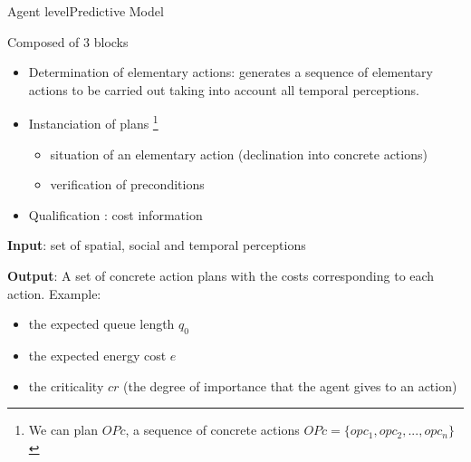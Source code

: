 \begin{frame}{Agent level}{Predictive Model}
\par Composed of 3 blocks
\begin{itemize}
    \item Determination of elementary actions: generates a sequence of elementary actions to be carried out taking into account all temporal perceptions.
    \item Instanciation of plans \footnote{We can plan $OPc$, a sequence of concrete actions $OPc = \{opc_{1}, opc_{2}, ... , opc_{n} \}$}
    \begin{itemize}
        \item situation of an elementary action (declination into concrete actions)
        \item verification of preconditions
    \end{itemize}
    \item Qualification : cost information
\end{itemize}
\par \textbf{Input}: set of spatial, social and temporal perceptions
\par \textbf{Output}: 
A set of concrete action plans with the costs corresponding to each action. Example:
\begin{itemize}
    \item the expected queue length $q_0$
    \item the expected energy cost $e$
    \item the criticality $cr$ (the degree of importance that the agent gives to an action)
\end{itemize}


\note{

}
\end{frame}
